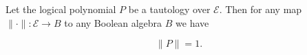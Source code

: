 Let the logical polynomial $P$ be a tautology over $\mathcal{E}$. Then for any map $\|\cdot\| : \mathcal{E} \to B$ to any Boolean algebra $B$ we have

$$\|P\| = 1.$$
